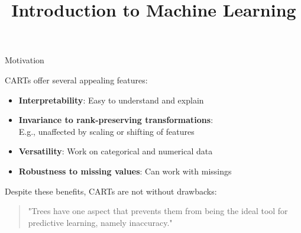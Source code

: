 \documentclass[11pt,compress,t,notes=noshow, xcolor=table]{beamer}
\title{Introduction to Machine Learning}
\begin{document}

\begin{vbframe}{Motivation}

CARTs offer several appealing features:

\begin{itemize}
  \item \textbf{Interpretability}: Easy to understand and explain
  \item \textbf{Invariance to rank-preserving transformations}: \\
    E.g., unaffected by scaling or shifting of features
  \item \textbf{Versatility}: Work on categorical and numerical data
  \item \textbf{Robustness to missing values}: Can work with missings
\end{itemize}

\lz \lz

Despite these benefits, CARTs are not without drawbacks:

\lz

\begin{quotation}
"Trees have one aspect that prevents them from being the ideal tool for predictive learning, namely inaccuracy."
\end{quotation}

\end{vbframe}
\end{document}
